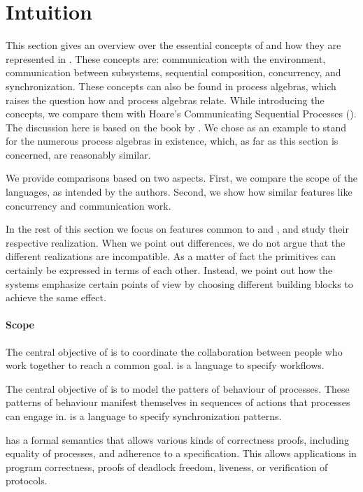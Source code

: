 
\section{Intuition}

This section gives an overview over the essential concepts of \TOP and how they are represented in \TOPHAT.
These concepts are: communication with the environment, communication between subsystems, sequential composition, concurrency, and synchronization.
These concepts can also be found in process algebras, which raises the question how \TOP and process algebras relate.
While introducing the concepts, we compare them with Hoare's Communicating Sequential Processes (\CSP).
The discussion here is based on the book by \citet{books/Hoare85CSP}.
We chose \CSP as an example to stand for the numerous process algebras in existence, which, as far as this section is concerned, are reasonably similar.

We provide comparisons based on two aspects.
First, we compare the scope of the languages, as intended by the authors.
Second, we show how similar features like concurrency and communication work.

In the rest of this section we focus on features common to \TOP and \CSP, and study their respective realization.
When we point out differences, we do not argue that the different realizations are incompatible.
As a matter of fact the primitives can certainly be expressed in terms of each other.
Instead, we point out how the systems emphasize certain points of view by choosing different building blocks to achieve the same effect.


\paragraph{Scope}

The central objective of \TOP is to coordinate the collaboration between people who work together to reach a common goal.
\TOP is a language to specify workflows.

The central objective of \CSP is to model the patters of behaviour of processes.
These patterns of behaviour manifest themselves in sequences of actions that processes can engage in.
\CSP is a language to specify synchronization patterns.

\CSP has a formal semantics that allows various kinds of correctness proofs, including equality of processes, and adherence to a specification.
This allows applications in program correctness, proofs of deadlock freedom, liveness, or verification of protocols.

